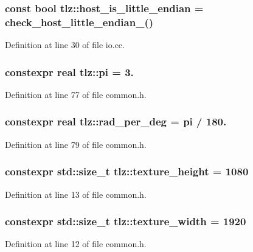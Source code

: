 \subsubsection[{\texorpdfstring{host\+\_\+is\+\_\+little\+\_\+endian}{host_is_little_endian}}]{\setlength{\rightskip}{0pt plus 5cm}const bool tlz\+::host\+\_\+is\+\_\+little\+\_\+endian = check\+\_\+host\+\_\+little\+\_\+endian\+\_\+()}\hypertarget{namespacetlz_a042151a8f7bfa1208c9be493b4d40e2c}{}\label{namespacetlz_a042151a8f7bfa1208c9be493b4d40e2c}


Definition at line 30 of file io.\+cc.

\subsubsection[{\texorpdfstring{pi}{pi}}]{\setlength{\rightskip}{0pt plus 5cm}constexpr {\bf real} tlz\+::pi = 3.}\hypertarget{namespacetlz_ac4eee635011d10eb47adf9eba0e6b977}{}\label{namespacetlz_ac4eee635011d10eb47adf9eba0e6b977}


Definition at line 77 of file common.\+h.

\subsubsection[{\texorpdfstring{rad\+\_\+per\+\_\+deg}{rad_per_deg}}]{\setlength{\rightskip}{0pt plus 5cm}constexpr {\bf real} tlz\+::rad\+\_\+per\+\_\+deg = {\bf pi} / 180.}\hypertarget{namespacetlz_a79e0cbce3856b92202ca2107fb7e495d}{}\label{namespacetlz_a79e0cbce3856b92202ca2107fb7e495d}


Definition at line 79 of file common.\+h.

\subsubsection[{\texorpdfstring{texture\+\_\+height}{texture_height}}]{\setlength{\rightskip}{0pt plus 5cm}constexpr std\+::size\+\_\+t tlz\+::texture\+\_\+height = 1080}\hypertarget{namespacetlz_afb346da3114b6061a9bc5ce4a95b93fc}{}\label{namespacetlz_afb346da3114b6061a9bc5ce4a95b93fc}


Definition at line 13 of file common.\+h.

\subsubsection[{\texorpdfstring{texture\+\_\+width}{texture_width}}]{\setlength{\rightskip}{0pt plus 5cm}constexpr std\+::size\+\_\+t tlz\+::texture\+\_\+width = 1920}\hypertarget{namespacetlz_a9e9fa482b4c479c635c496e96014f75a}{}\label{namespacetlz_a9e9fa482b4c479c635c496e96014f75a}


Definition at line 12 of file common.\+h.

